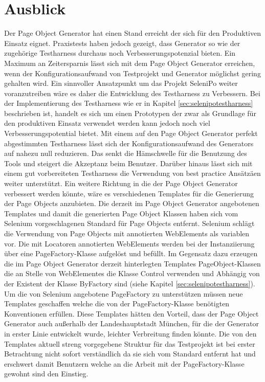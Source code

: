 \section{Ausblick}
\label{ausblick}
Der Page Object Generator hat einen Stand erreicht der sich für den Produktiven Einsatz eignet. Praxistests haben jedoch gezeigt, dass Generator so wie der zugehörige Testharness durchaus noch Verbesserungspotenzial bieten.
Ein Maximum an Zeitersparnis lässt sich mit dem Page Object Generator erreichen, wenn der Konfigurationsaufwand von Testprojekt und Generator möglichst gering gehalten wird.
Ein sinnvoller Ansatzpunkt um das Projekt SeleniPo weiter voranzutreiben wäre es daher die Entwicklung des Testharness zu Verbessern. Bei der Implementierung des Testharness wie er in Kapitel \ref{sec:selenipotestharness} beschrieben ist, handelt es sich um einen Prototypen der zwar als Grundlage für den produktiven Einsatz verwendet werden kann jedoch noch viel Verbesserungspotential bietet. Mit einem auf den Page Object Generator perfekt abgestimmten Testharness lässt sich der Konfigurationsaufwand des Generators auf nahezu null reduzieren. Das senkt die Hämschwelle für die Benutzung des Tools und steigert die Akzeptanz beim Benutzer.
Darüber hinaus lässt sich mit einem gut vorbereiteten Testharness die Verwendung von best practice Ansätzäen weiter unterstützt.
Ein weitere Richtung in die der Page Object Generator verbessert werden könnte, wäre es verschiedenen Templates für die Generierung der Page Objects anzubieten.
Die derzeit im Page Object Generator angebotenen Templates und damit die generierten Page Object Klassen haben sich vom Selenium vorgeschlagenen Standard für Page Objects entfernt. Selenium schlägt die Verwendung von Page Objects mit annotierten WebElements als variablen vor. Die mit Locatoren annotierten WebElements werden bei der Instanziierung über eine PageFactory-Klasse aufgelöst und befüllt.
Im Gegensatz dazu erzeugen die im Page Object Generator derzeit hinterlegten Templates PageObject-Klassen die an Stelle von WebElementes die Klasse Control verwenden und Abhängig von der Existent der Klasse ByFactory sind (siehe Kapitel \ref{sec:selenipotestharness}). Um die von Selenium angebotene PageFactory zu unterstützen müssen neue Templates geschaffen welche die von der PageFactory-Klasse benötigten Konventionen erfüllen.
Diese Templates hätten den Vorteil, dass der Page Object Generator auch außerhalb der Landeshauptstadt München, für die der Generator in erster Linie entwickelt wurde, leichter Verbreitung finden könnte. Die von den Templates aktuell streng vorgegebene Struktur für das Testprojekt ist bei erster Betrachtung nicht sofort verständlich da sie sich vom Standard entfernt hat und erschwert damit Benutzern welche an die Arbeit mit der PageFactory-Klasse gewohnt sind den Einstieg.












